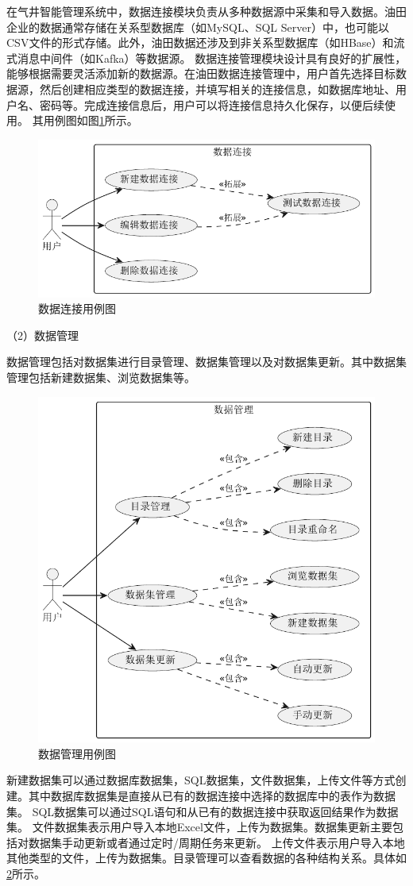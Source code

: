 在气井智能管理系统中，数据连接模块负责从多种数据源中采集和导入数据。油田企业的数据通常存储在关系型数据库（如MySQL、SQL Server）中，也可能以CSV文件的形式存储。此外，油田数据还涉及到非关系型数据库（如HBase）和流式消息中间件（如Kafka）等数据源。
数据连接管理模块设计具有良好的扩展性，能够根据需要灵活添加新的数据源。在油田数据连接管理中，用户首先选择目标数据源，然后创建相应类型的数据连接，并填写相关的连接信息，如数据库地址、用户名、密码等。完成连接信息后，用户可以将连接信息持久化保存，以便后续使用。
其用例图如图\ref{fig:dataconnectionusecase}所示。
\begin{figure}[H]
    \centering
    \label{fig:dataconnectionusecase}
    \includegraphics[width=.7\linewidth]{figure/数据连接用例图.pdf}
    \caption{数据连接用例图}
\end{figure}

（2）数据管理 

数据管理包括对数据集进行目录管理、数据集管理以及对数据集更新。其中数据集管理包括新建数据集、浏览数据集等。
\begin{figure}[h]
    \centering
    \includegraphics[width=.6\linewidth]{figure/数据管理用例图 .pdf}
    \caption{数据管理用例图}
    \label{fig:datamaucase}
\end{figure}
新建数据集可以通过数据库数据集，SQL数据集，文件数据集，上传文件等方式创建。其中数据库数据集是直接从已有的数据连接中选择的数据库中的表作为数据集。
SQL数据集可以通过SQL语句和从已有的数据连接中获取返回结果作为数据集。
文件数据集表示用户导入本地Excel文件，上传为数据集。数据集更新主要包括对数据集手动更新或者通过定时/周期任务来更新。
上传文件表示用户导入本地其他类型的文件，上传为数据集。目录管理可以查看数据的各种结构关系。具体如\ref{fig:datamaucase}所示。

